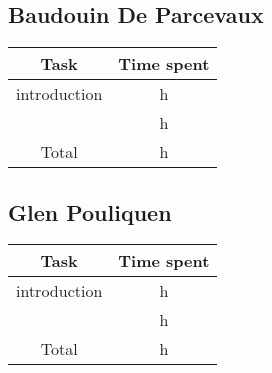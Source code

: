\subsection{Baudouin De Parcevaux}
\begin{tabular}{| c | c | }
	\hline
	\textbf{Task} & \textbf{Time spent} \\ 
	\hline\hline
	introduction & h \\
 	& h\\
	\hline
	Total & h \\
	\hline
\end{tabular}

\subsection{Glen Pouliquen}
\begin{tabular}{| c | c | }
	\hline
	\textbf{Task} & \textbf{Time spent} \\ 
	\hline\hline
	introduction & h \\
	& h\\
	\hline
	Total & h \\
	\hline
\end{tabular}